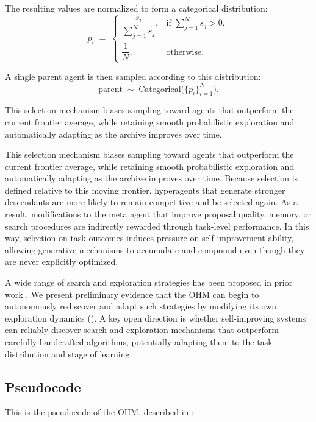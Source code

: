 \documentclass[]{fairmeta}
\begin{document}
The resulting values are normalized to form a categorical distribution:
\[
p_i \;=\;
\begin{cases}
\dfrac{s_i}{\sum_{j=1}^N s_j}, & \text{if } \sum_{j=1}^N s_j > 0, \\[10pt]
\dfrac{1}{N}, & \text{otherwise}.
\end{cases}
\]

A single parent agent is then sampled according to this distribution:
\[
\text{parent} \;\sim\; \mathrm{Categorical}\bigl(\{p_i\}_{i=1}^N\bigr).
\]

This selection mechanism biases sampling toward agents that outperform the current frontier average, while retaining smooth probabilistic exploration and automatically adapting as the archive improves over time.

This selection mechanism biases sampling toward agents that outperform the current frontier average, while retaining smooth probabilistic exploration and automatically adapting as the archive improves over time. Because selection is defined relative to this moving frontier, hyperagents that generate stronger descendants are more likely to remain competitive and be selected again. As a result, modifications to the meta agent that improve proposal quality, memory, or search procedures are indirectly rewarded through task-level performance. In this way, selection on task outcomes induces pressure on self-improvement ability, allowing generative mechanisms to accumulate and compound even though they are never explicitly optimized.

A wide range of search and exploration strategies has been proposed in prior work \citep{coulom2006efficient, silver2016mastering, herr2025llm, wang2025huxley, weng2026group}. We present preliminary evidence that the OHM can begin to autonomously rediscover and adapt such strategies by modifying its own exploration dynamics (). A key open direction is whether self-improving systems can reliably discover search and exploration mechanisms that outperform carefully handcrafted algorithms, potentially adapting them to the task distribution and stage of learning.

\subsection{Pseudocode}
\label{app:pseudocode}

This is the pseudocode of the OHM, described in :
\end{document}
